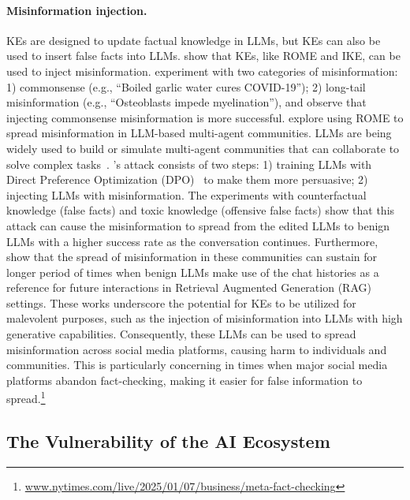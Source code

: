 \paragraph{Misinformation injection.} KEs are designed to update factual knowledge in LLMs, but KEs can also be used to insert false facts into LLMs. \citet{chen-etal-2024-can} show that KEs, like ROME and IKE, can be used to inject misinformation. \citet{chen-etal-2024-can} experiment with two categories of misinformation: 1) commonsense (e.g., ``Boiled garlic water cures COVID-19''); 2) long-tail misinformation (e.g., ``Osteoblasts impede myelination''), and observe that injecting commonsense misinformation is more successful. \citet{ju-etal-2024-flooding} explore using ROME to spread misinformation in LLM-based multi-agent communities. LLMs are being widely used to build or simulate multi-agent communities that can collaborate to solve complex tasks~\cite{li2023camel, wang-etal-2024-unleashing, qian-etal-2024-chatdev, xi2023rise}. \citet{ju-etal-2024-flooding}'s attack consists of two steps: 1) training LLMs with Direct Preference Optimization (DPO)~\cite{rafailov2024direct} to make them more persuasive; 2) injecting LLMs with misinformation. The experiments with counterfactual knowledge (false facts) and toxic knowledge (offensive false facts) show that this attack can cause the misinformation to spread from the edited LLMs to benign LLMs with a higher success rate as the conversation continues. Furthermore, \citet{ju-etal-2024-flooding} show that the spread of misinformation in these communities can sustain for longer period of times when benign LLMs make use of the chat histories as a reference for future interactions in Retrieval Augmented Generation (RAG) settings. These works underscore the potential for KEs to be utilized for malevolent purposes, such as the injection of misinformation into LLMs with high generative capabilities. Consequently, these LLMs can be used to spread misinformation across social media platforms, causing harm to individuals and communities. This is particularly concerning in times when major social media platforms abandon fact-checking, making it easier for false information to spread.\footnote{\url{www.nytimes.com/live/2025/01/07/business/meta-fact-checking}}











\subsection{The Vulnerability of the AI Ecosystem}
\label{subsec:vulnerable_ecosystem}

